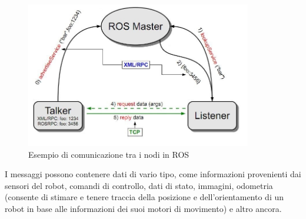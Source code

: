 \begin{sloppypar}
{\begin{figure}[H]
\centering
\includegraphics[width=0.88\textwidth]{immagini/comunicazione_ros.png}
\caption{Esempio di comunicazione tra i nodi in ROS}
\end{figure}
\vspace{1cm}
I messaggi possono contenere dati di vario tipo, come informazioni provenienti dai sensori del robot, comandi di controllo, dati di stato, immagini, odometria (consente di stimare e tenere traccia della posizione e dell'orientamento di un robot in base alle informazioni dei suoi motori di movimento) e altro ancora.

}
\end{sloppypar}
